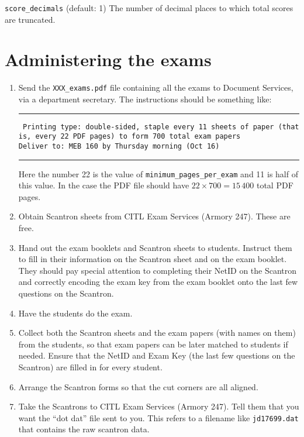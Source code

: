 \documentclass{article}
\begin{document}
\hangindent=1cm \texttt{score_decimals} (default: 1)
The number of decimal places to which total scores are truncated.

\section{Administering the exams}

\begin{enumerate}
\item Send the \texttt{XXX_exams.pdf} file
  containing all the exams to Document Services, via a department
  secretary. The instructions should be something like:

  \rule{\linewidth}{0.5pt}

  \parbox{\linewidth}{
    \tt
    Printing type: double-sided, staple every 11 sheets of paper (that is, every 22 PDF pages) to form 700 total exam papers \\
    Deliver to: MEB 160 by Thursday morning (Oct 16)
  }

  \rule{\linewidth}{0.5pt}

  Here the number 22 is the value of \texttt{minimum_pages_per_exam} and
  11 is half of this value. In the case the PDF file should have $22
  \times 700 = 15\,400$ total PDF pages.
\item Obtain Scantron sheets from CITL Exam Services (Armory
  247). These are free.
\item Hand out the exam booklets and Scantron sheets to
  students. Instruct them to fill in their information on the Scantron
  sheet and on the exam booklet. They should pay special attention to
  completing their NetID on the Scantron and correctly encoding the
  exam key from the exam booklet onto the last few questions on the
  Scantron.
\item Have the students do the exam.
\item Collect both the Scantron sheets and the exam papers (with names
  on them) from the students, so that exam papers can be later matched
  to students if needed. Ensure that the NetID and Exam Key (the last
  few questions on the Scantron) are filled in for every student.
\item Arrange the Scantron forms so that the cut corners are all
  aligned.
\item Take the Scantrons to CITL Exam Services (Armory 247). Tell them
  that you want the ``dot dat'' file sent to you. This refers to a
  filename like \texttt{jd17699.dat} that contains the raw scantron
  data.
\end{enumerate}
\end{document}

